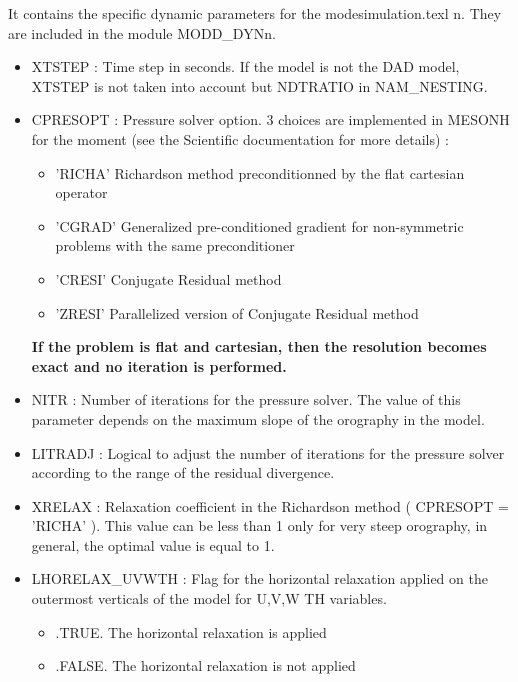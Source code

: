 It contains the specific dynamic parameters  for the modesimulation.texl n. They
are included in the module MODD\_DYNn. 
\begin{itemize}

\item
XTSTEP : Time step in seconds. If the model is not the DAD model,
XTSTEP is not taken into account but NDTRATIO in NAM\_NESTING.

\item
CPRESOPT :
 Pressure solver option. 3 choices are implemented in MESONH for the
moment (see the Scientific documentation for more details) : 

\begin{itemize}
\item 'RICHA' Richardson method preconditionned by the flat cartesian operator   
\item 'CGRAD' Generalized pre-conditioned gradient for non-symmetric problems
 with the same preconditioner
\item 'CRESI' Conjugate Residual method
\item 'ZRESI' Parallelized version of Conjugate Residual method
\end{itemize}
{\bf If the problem is flat and cartesian, then the resolution
becomes exact and no iteration is performed.}

\item
NITR : Number of iterations for the  pressure solver. The value of this
parameter depends on the maximum slope of the orography  in the model.  

\item
LITRADJ : Logical to adjust the number of iterations for the  pressure solver according to the range of the residual divergence. 

\item
{}
XRELAX : Relaxation coefficient in the Richardson method ( CPRESOPT = 'RICHA' ).
This value can be less than 1 only for very steep orography, in general, the
optimal value is equal to 1.


\item
{}
LHORELAX\_UVWTH : Flag for the horizontal relaxation applied on the
outermost verticals of the model for U,V,W TH variables. 
\begin{itemize}
\item   .TRUE. The horizontal  relaxation is applied 
\item   .FALSE. The horizontal  relaxation is not applied 
\end{itemize}


\end{itemize}
